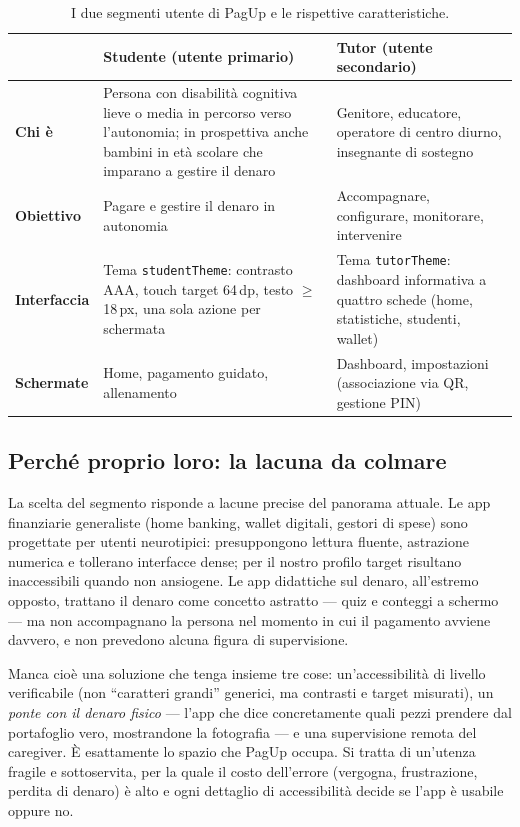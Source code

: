 \documentclass[11pt,a4paper]{article}
\begin{document}
\begin{table}[H]
\centering
\renewcommand{\arraystretch}{1.35}
\begin{tabularx}{\textwidth}{@{}p{3.2cm}XX@{}}
\toprule
 & \textbf{Studente (utente primario)} & \textbf{Tutor (utente secondario)} \\
\midrule
\textbf{Chi \`e} & Persona con disabilit\`a cognitiva lieve o media in percorso verso
l'autonomia; in prospettiva anche bambini in et\`a scolare che imparano a gestire il denaro
& Genitore, educatore, operatore di centro diurno, insegnante di sostegno \\
\textbf{Obiettivo} & Pagare e gestire il denaro in autonomia & Accompagnare, configurare,
monitorare, intervenire \\
\textbf{Interfaccia} & Tema \texttt{studentTheme}: contrasto AAA, touch target 64\,dp, testo
$\geq$18\,px, una sola azione per schermata & Tema \texttt{tutorTheme}: dashboard informativa a
quattro schede (home, statistiche, studenti, wallet) \\
\textbf{Schermate} & Home, pagamento guidato, allenamento & Dashboard, impostazioni (associazione
via QR, gestione PIN) \\
\bottomrule
\end{tabularx}
\caption{I due segmenti utente di PagUp e le rispettive caratteristiche.}
\end{table}

\subsection{Perch\'e proprio loro: la lacuna da colmare}

La scelta del segmento risponde a lacune precise del panorama attuale. Le app finanziarie
generaliste (home banking, wallet digitali, gestori di spese) sono progettate per utenti
neurotipici: presuppongono lettura fluente, astrazione numerica e tollerano interfacce dense; per
il nostro profilo target risultano inaccessibili quando non ansiogene. Le app didattiche sul
denaro, all'estremo opposto, trattano il denaro come concetto astratto --- quiz e conteggi a
schermo --- ma non accompagnano la persona nel momento in cui il pagamento avviene davvero, e non
prevedono alcuna figura di supervisione.

Manca cio\`e una soluzione che tenga insieme tre cose: un'accessibilit\`a di livello verificabile
(non ``caratteri grandi'' generici, ma contrasti e target misurati), un \emph{ponte con il denaro
fisico} --- l'app che dice concretamente quali pezzi prendere dal portafoglio vero, mostrandone la
fotografia --- e una supervisione remota del caregiver. \`E esattamente lo spazio che PagUp
occupa. Si tratta di un'utenza fragile e sottoservita, per la quale il costo dell'errore
(vergogna, frustrazione, perdita di denaro) \`e alto e ogni dettaglio di accessibilit\`a decide se
l'app \`e usabile oppure no.
\end{document}
